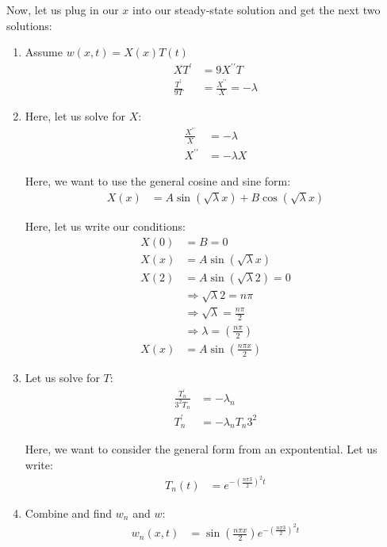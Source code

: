 Now, let us plug in our $x$ into our steady-state solution and get the next two solutions:
%
\begin{enumerate}
\item Assume $w(x, t) = X(x)T(t)$
%
\begin{align}
  XT^\prime & = 9X^{\prime\prime}T\\
  \frac{T^\prime}{9T} & = \frac{X^{\prime\prime}}{X} = -\lambda
\end{align}

\item Here, let us solve for $X$:
%
\begin{align}
  \frac{X^{\prime\prime}}{X} & = -\lambda\\
  X^{\prime\prime} & = -\lambda X
\end{align}

Here, we want to use the general cosine and sine form:
%
\begin{align}
  X(x) & = A \sin \left( \sqrt \lambda x \right) + B \cos \left( \sqrt \lambda x \right)
\end{align}

Here, let us write our conditions:
%
\begin{align}
  X(0) & = B = 0\\
  X(x) & = A \sin \left( \sqrt \lambda x \right)\\
  X(2) & = A \sin \left( \sqrt \lambda 2 \right) = 0\\
  & \Rightarrow \sqrt \lambda 2 = n \pi\\
  & \Rightarrow \sqrt \lambda = \frac{n \pi}{2}\\
  & \Rightarrow \lambda = \left(\frac{n \pi}{2}\right)\\
  X(x) & = A \sin\left(\frac{n \pi x}{2}\right)
\end{align}

\item Let us solve for $T$:
%
\begin{align}
  \frac{T^\prime_n}{3^2 T_n} & = -\lambda_n\\
  T^\prime_n & = -\lambda_n T_n 3^2
\end{align}

Here, we want to consider the general form from an expontential. Let us write:
%
\begin{align}
  T_n(t) & = e^{- \left( \frac{n \pi 3}{2} \right)^2 t}
\end{align}

\item Combine and find $w_n$ and $w$:
%
\begin{align}
  w_n(x, t) & =
  \sin\left(\frac{n \pi x}{2}\right)
  e^{- \left( \frac{n \pi 3}{2} \right)^2 t}
\end{align}


\end{enumerate}
